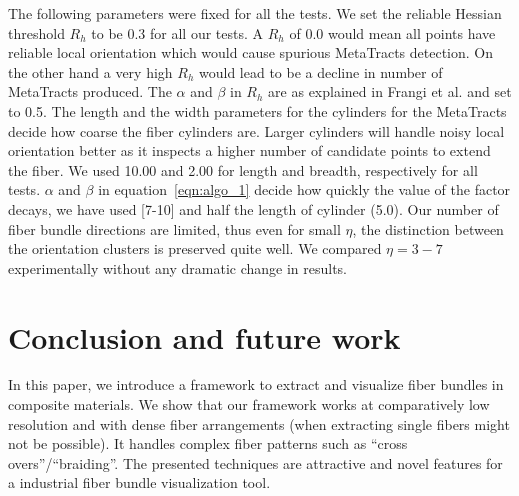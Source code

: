 The following parameters were fixed for all the tests. We set the reliable Hessian threshold $R_{h}$ to be 0.3 for all our tests. A $R_{h}$ of 0.0 would mean all points have reliable local orientation which would cause spurious MetaTracts detection. On the other hand a very high $ R_{h}$ would lead to be a decline in number of MetaTracts produced. The $\alpha$ and $\beta$ in $R_{h}$ are as explained in Frangi et al. \cite{Frangi1998} and set to 0.5. The length and the width parameters for the cylinders for the MetaTracts decide how coarse the fiber cylinders are. Larger cylinders will handle noisy local orientation better as it inspects a higher number of candidate points to extend the fiber. We used 10.00 and 2.00 for length and breadth, respectively for all tests. $\alpha$ and $\beta$ in equation~\ref{eqn:algo_1} decide how quickly the value of the factor decays, we have used [7-10] and half the length of cylinder (5.0). Our number of fiber bundle directions are limited, thus even for small $\eta$, the distinction between  the orientation clusters is preserved quite well. We compared  $\eta=3-7$ experimentally without any dramatic change in results. 







\section{Conclusion and future work}
In this paper, we introduce a framework to extract and visualize fiber bundles in composite materials. We show that our framework works at comparatively low resolution and with dense fiber arrangements (when extracting single fibers might not be possible). It handles complex fiber patterns such as ``cross overs''/``braiding''. The presented techniques are attractive and novel features for a industrial fiber bundle visualization tool.


